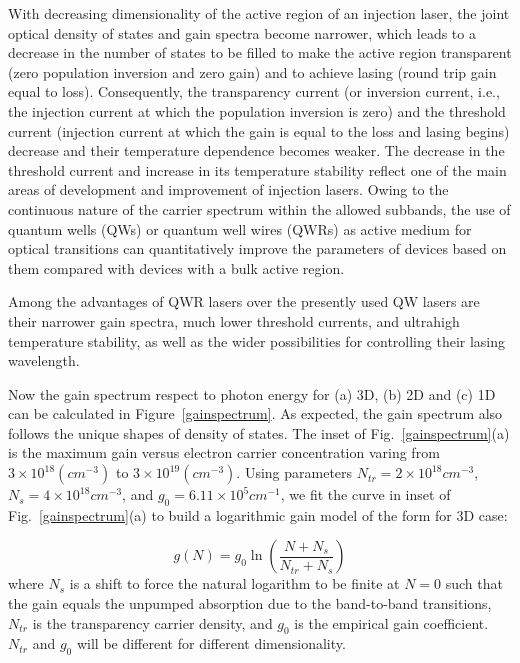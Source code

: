 With decreasing dimensionality of the active region of an injection laser, the
joint optical density of states and gain spectra become narrower, which leads
to a decrease in the number of states to be filled to make the active region
transparent (zero population inversion and zero gain) and to achieve lasing
(round trip gain equal to loss). Consequently, the transparency current (or
inversion current, i.e., the injection current at which the population
inversion is zero) and the threshold current (injection current at which the
gain is equal to the loss and lasing begins) decrease and their temperature
dependence becomes weaker. The decrease in the threshold current and increase
in its temperature stability reflect one of the main areas of development and
improvement of injection lasers. Owing to the continuous nature of the carrier
spectrum within the allowed subbands, the use of quantum wells (QWs) or quantum
well wires (QWRs) as active medium for optical transitions can quantitatively
improve the parameters of devices based on them compared with devices with a
bulk active region.

Among the advantages of QWR lasers over the presently used QW lasers are their
narrower gain spectra, much lower threshold currents, and ultrahigh temperature
stability, as well as the wider possibilities for controlling their lasing
wavelength.

Now the gain spectrum respect to photon energy for (a) 3D, (b) 2D and (c) 1D
can be calculated in Figure~\ref{gainspectrum}. As expected, the gain spectrum
also follows the unique shapes of density of states. The inset of
Fig.~\ref{gainspectrum}(a) is the maximum gain versus electron carrier
concentration varing from $3\times10^{18} (cm^{-3})$ to
$3\times10^{19}(cm^{-3})$. Using parameters $N_{tr} = 2\times10^{18} cm^{-3}$,
$N_{s} = 4\times10^{18} cm^{-3}$, and $g_0 = 6.11\times10^{5} cm^{-1}$, we fit
the curve in inset of Fig.~\ref{gainspectrum}(a) to build a logarithmic gain
model of the form for 3D case:

\begin{equation}
  g(N) = g_0\ln\left(\frac{N+N_s}{N_{tr}+ N_s}\right)
\end{equation}
where $N_s$ is a shift to force the natural logarithm to be finite at $N = 0$
such that the gain equals the unpumped absorption due to the band-to-band
transitions, $N_{tr}$ is the transparency carrier density, and $g_0$ is the
empirical gain coefficient. $N_{tr}$ and $g_0$ will be different for different
dimensionality.

